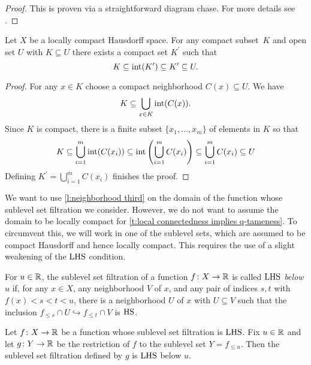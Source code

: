 \begin{proof}
	This is proven via a straightforward diagram chase.
	For more details see \cite[Lemma II.17.3]{Bredon.1997}.
\end{proof}

\begin{lem} \label{l:neighborhood third}
	Let $X$ be a locally compact Hausdorff space.
	For any compact subset~$K$ and open set $U$ with $K \subseteq U$ there exists a compact set $K^\prime$ such that
	\begin{equation*}
	K \subseteq \operatorname{int}(K^\prime) \subseteq K^\prime \subseteq U.
	\end{equation*}
\end{lem}

\begin{proof}
	For any $x \in K$ choose a compact neighborhood $C(x) \subseteq U$.
	We have
	\begin{equation*}
	K \subseteq \bigcup_{x \in K} \operatorname{int}(C(x)).
	\end{equation*}
	Since $K$ is compact, there is a finite subset $\{x_1, \dots, x_m\}$ of elements in $K$ so that
	\begin{equation*}
	K \subseteq \bigcup_{i=1}^m \operatorname{int}(C(x_i)) \subseteq \operatorname{int}\left(\bigcup_{i=1}^m C(x_i)\right) \subseteq \bigcup_{i=1}^m C(x_i) \subseteq U
	\end{equation*}
	Defining $K^\prime = \bigcup_{i=1}^m C(x_i)$ finishes the proof.
\end{proof}

We want to use \cref{l:neighborhood third} on the domain of the function whose sublevel set filtration we consider.
However, we do not want to assume the domain to be locally compact for \cref{t:local connectedness implies q-tameness}.
To circumvent this, we will work in one of the sublevel sets, which are assumed to be compact Hausdorff and hence locally compact.
This requires the use of a slight weakening of the $\mathrm{LHS}$ condition.

\begin{defi}
	For $u \in \mathbb{R}$, the sublevel set filtration of a function $f \colon X \to \mathbb{R}$ is called \emph{$\mathrm{LHS}$ below $u$} if, for any $x \in X$, any neighborhood $V$ of $x$, and any pair of indices $s,t$ with $f(x) < s < t < u$, there is a neighborhood $U$ of $x$ with $U \subseteq V$ such that the inclusion $f_{\leq s} \cap U \hookrightarrow f_{\leq t} \cap V$ is $\mathrm{HS}$.
\end{defi}

\begin{lem} \label{l:restriction of LHS filtration}
	Let $f \colon X \to \mathbb{R}$ be a function whose sublevel set filtration is $\mathrm{LHS}$.
	Fix $u \in \mathbb{R}$ and let $g \colon Y \to \mathbb{R}$ be the restriction of $f$ to the sublevel set $Y = f_{\leq u}$.
	Then the sublevel set filtration defined by $g$ is $\mathrm{LHS}$ below $u$.
\end{lem}

